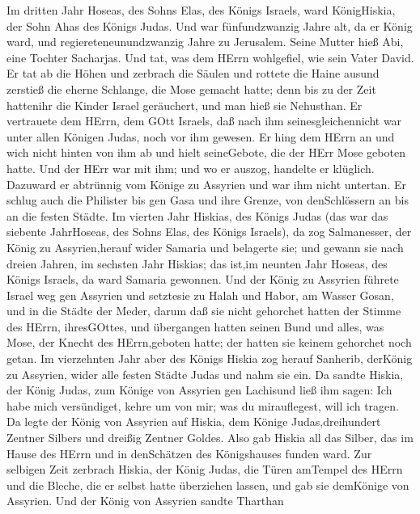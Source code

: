  Im dritten Jahr Hoseas, des Sohns Elas, des Königs Israels,
ward KönigHiskia, der Sohn Ahas des Königs Judas.  Und war
fünfundzwanzig Jahre alt, da er König ward, und regiereteneunundzwanzig
Jahre zu Jerusalem. Seine Mutter hieß Abi, eine Tochter Sacharjas.
 Und tat, was dem HErrn wohlgefiel, wie sein Vater David.
 Er tat ab die Höhen und zerbrach die Säulen und rottete die
Haine ausund zerstieß die eherne Schlange, die Mose gemacht hatte; denn
bis zu der Zeit hattenihr die Kinder Israel geräuchert, und man hieß sie
Nehusthan.  Er vertrauete dem HErrn, dem GOtt Israels, daß
nach ihm seinesgleichennicht war unter allen Königen Judas, noch vor ihm
gewesen.  Er hing dem HErrn an und wich nicht hinten von ihm
ab und hielt seineGebote, die der HErr Mose geboten hatte. 
Und der HErr war mit ihm; und wo er auszog, handelte er klüglich.
Dazuward er abtrünnig vom Könige zu Assyrien und war ihm nicht untertan.
 Er schlug auch die Philister bis gen Gasa und ihre Grenze,
von denSchlössern an bis an die festen Städte.  Im vierten
Jahr Hiskias, des Königs Judas (das war das siebente JahrHoseas, des
Sohns Elas, des Königs Israels), da zog Salmanesser, der König zu
Assyrien,herauf wider Samaria und belagerte sie;  und
gewann sie nach dreien Jahren, im sechsten Jahr Hiskias; das ist,im
neunten Jahr Hoseas, des Königs Israels, da ward Samaria gewonnen.
 Und der König zu Assyrien führete Israel weg gen Assyrien
und setztesie zu Halah und Habor, am Wasser Gosan, und in die Städte der
Meder,  darum daß sie nicht gehorchet hatten der Stimme des
HErrn, ihresGOttes, und übergangen hatten seinen Bund und alles, was
Mose, der Knecht des HErrn,geboten hatte; der hatten sie keinem
gehorchet noch getan.  Im vierzehnten Jahr aber des Königs
Hiskia zog herauf Sanherib, derKönig zu Assyrien, wider alle festen
Städte Judas und nahm sie ein.  Da sandte Hiskia, der König
Judas, zum Könige von Assyrien gen Lachisund ließ ihm sagen: Ich habe
mich versündiget, kehre um von mir; was du mirauflegest, will ich
tragen. Da legte der König von Assyrien auf Hiskia, dem Könige
Judas,dreihundert Zentner Silbers und dreißig Zentner Goldes.
 Also gab Hiskia all das Silber, das im Hause des HErrn und
in denSchätzen des Königshauses funden ward.  Zur selbigen
Zeit zerbrach Hiskia, der König Judas, die Türen amTempel des HErrn und
die Bleche, die er selbst hatte überziehen lassen, und gab sie demKönige
von Assyrien.  Und der König von Assyrien sandte Tharthan
